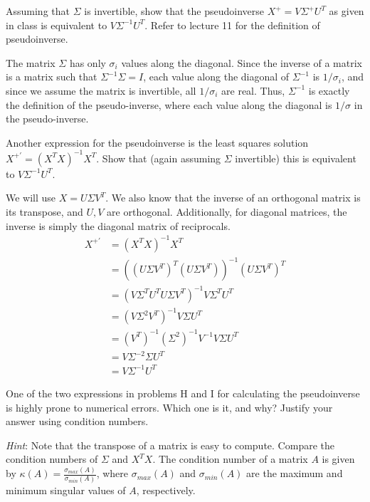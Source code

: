\problem[4] Assuming that $\Sigma$ is invertible, show that the pseudoinverse $X^+ = V\Sigma^+ U^T$ as given in class is equivalent to $V\Sigma^{-1} U^T$. Refer to lecture 11 for the definition of pseudoinverse.

\begin{solution}
    The matrix $\Sigma$ has only $\sigma_i$ values along the diagonal. Since the inverse of a matrix is a matrix such that $\Sigma^{-1} \Sigma = I$, each value along the diagonal of $\Sigma^{-1}$ is $1 / \sigma_i$, and since we assume the matrix is invertible, all $1 / \sigma_i$ are real. Thus, $\Sigma^{-1}$ is exactly the definition of the pseudo-inverse, where each value along the diagonal is $1/\sigma$ in the pseudo-inverse.
\end{solution}

\newpage

\problem[4] Another expression for the pseudoinverse is the least squares solution $X^{+'} = (X^T X)^{-1}X^T$. Show that (again assuming $\Sigma$ invertible) this is equivalent to $V\Sigma^{-1}U^T$.

\begin{solution}
    We will use $X = U \Sigma V^T$. We also know that the inverse of an orthogonal matrix is its transpose, and $U,V$ are orthogonal. Additionally, for diagonal matrices, the inverse is simply the diagonal matrix of reciprocals.
    \begin{align*}
        X^{+'} &= (X^T X)^{-1} X^T\\
        &= ((U \Sigma V^T)^T (U \Sigma V^T))^{-1} (U \Sigma V^T)^T\\
        &= (V \Sigma^T U^T U \Sigma V^T)^{-1} V \Sigma^T U^T\\
        &= (V \Sigma^2 V^T)^{-1} V \Sigma U^T\\
        &= (V^T)^{-1} (\Sigma^2)^{-1} V^{-1} V \Sigma U^T\\
        &= V \Sigma^{-2} \Sigma U^T\\
        &= V \Sigma^{-1} U^T
    \end{align*}
\end{solution}

\problem[2] One of the two expressions in problems H and I for calculating the pseudoinverse is highly prone to numerical errors. Which one is it, and why? Justify your answer using condition numbers.

\textit{Hint}: Note that the transpose of a matrix is easy to compute. Compare the condition numbers of $\Sigma$ and $X^T X$. The condition number of a matrix $A$ is given by $\kappa(A) = \frac{\sigma_{max}(A)}{\sigma_{min}(A)}$, where $\sigma_{max}(A)$ and $\sigma_{min}(A)$ are the maximum and minimum singular values of $A$, respectively.


